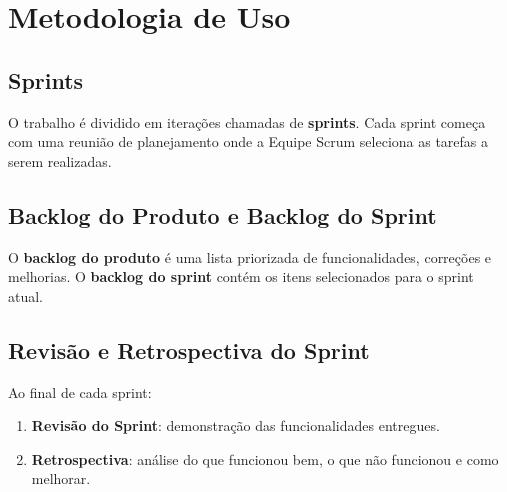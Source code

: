 \chapter*{Metodologia de Uso}

\section{Sprints}
O trabalho é dividido em iterações chamadas de \textbf{sprints}. 
Cada sprint começa com uma reunião de planejamento onde a Equipe Scrum 
seleciona as tarefas a serem realizadas.

\section{Backlog do Produto e Backlog do Sprint}
O \textbf{backlog do produto} é uma lista priorizada de funcionalidades, correções e melhorias.  
O \textbf{backlog do sprint} contém os itens selecionados para o sprint atual.

\section{Revisão e Retrospectiva do Sprint}
Ao final de cada sprint:
\begin{enumerate}
    \item \textbf{Revisão do Sprint}: demonstração das funcionalidades entregues.
    \item \textbf{Retrospectiva}: análise do que funcionou bem, o que não funcionou e como melhorar.
\end{enumerate}